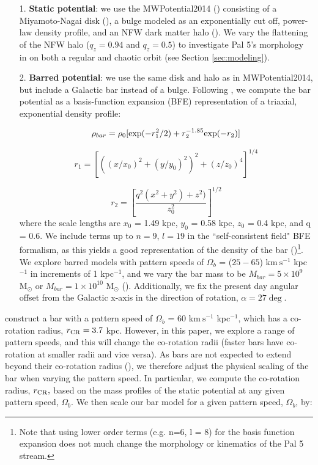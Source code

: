 \documentclass[modern]{aastex62}
\newcommand{\msun}{\textrm{M}_\odot}
\newcommand{\kms}{\ensuremath{\textrm{km}~\textrm{s}^{-1}}}
\begin{document}
\begin{itemize}
\item[1.] {\bf Static potential}: we use the {\small MWPotential2014} (\citealt{Bovy:2015}) consisting of a Miyamoto-Nagai disk (\citealt{Miyamoto:1975}), a bulge modeled as an exponentially cut off, power-law density profile, and an NFW dark matter halo (\citealt{Navarro:1996}). We vary the flattening of the NFW halo ($q_z = 0.94$ and $q_z = 0.5$) to investigate Pal 5's morphology in on both a regular and chaotic orbit (see Section \ref{sec:modeling}). 

\item[2.] {\bf  Barred potential}: we use the same disk and halo as in {\small MWPotential2014}, but include a Galactic bar instead of a bulge. Following \citet{wang:2012}, we compute the bar potential as a basis-function expansion (BFE) representation of a triaxial, exponential density profile:

\begin{equation}
\rho_{bar} = \rho_0 [{\rm exp} (-r^2_1/2) + r_2^{-1.85} {\rm exp}(-r_2) ]
\end{equation}

\begin{equation}
r_1 = \left[\left((x/x_0)^2 + (y/y_0)^2\right)^2 +( z/z_0)^4\right]^{1/4}
\end{equation}

\begin{equation}
r_2 = \left[\frac{q^2(x^2 + y^2) + z^2)}{z_0^2}\right]^{1/2}
\end{equation}
where the scale lengths are $x_0$ = 1.49 kpc, $y_0$ = 0.58 kpc, $z_0$ = 0.4 kpc, and q = 0.6. We include terms up to $n=9$, $l=19$ in the ``self-consistent field" BFE formalism, as this yields a good representation of the density of the bar (\citealt{Banik:2019})\footnote{Note that using lower order terms (e.g. n=6, l = 8) for the basis function expansion does not much change the morphology or kinematics of the Pal 5 stream.}. We explore barred models with pattern speeds of $\Omega_b$ = ($25 - 65$) $\kms$ kpc$^{-1}$ in increments of 1 kpc$^{-1}$, and  we vary the bar mass to be $M_{bar} = 5 \times 10^{9}$ $\msun$ or $M_{bar} = 1 \times 10^{10}$ $\msun$ (\citealt{Portail:2017}). Additionally, we fix the present day angular offset from the Galactic x-axis in the direction of rotation, $\alpha = 27\deg$.
\end{itemize}

\citet{wang:2012} construct a bar with a pattern speed of $\Omega_b$ =  60 $\kms$ kpc$^{-1}$, which has a co-rotation radius, $r_{\rm CR} = 3.7$ kpc. However, in this paper, we explore a range of pattern speeds, and this will change the co-rotation radii (faster bars have co-rotation at smaller radii and vice versa).  As bars are not expected to extend beyond their co-rotation radius (\citealt{binney:2008}), we therefore adjust the physical scaling of the bar when varying the pattern speed. %
In particular, we  compute the co-rotation radius, $r_{\rm CR},$ based on the mass profiles of the static potential at any given pattern speed, $\Omega_b$. We then scale our bar model for a given pattern speed, $\Omega_b$, by:
\end{document}
